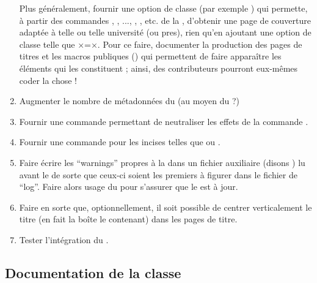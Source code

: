 \begin{enumerate}
  Plus généralement, fournir une option de classe (par exemple
  ) qui permette, à partir des commandes
  , , ...,
  , , etc. de la \yatcl{},
  d'obtenir une page de couverture adaptée à telle ou telle université (ou
  \gls{pres}), rien qu'en ajoutant une option de classe telle que
  ×=×. Pour ce faire, documenter la
  production des pages de titres et les macros publiques
  () qui permettent de faire apparaître les éléments
  qui les constituent ; ainsi, des contributeurs pourront eux-mêmes coder la
  chose !
\item Augmenter le nombre de métadonnées du  (au moyen du
   ?)
\item Fournir une commande  permettant de
  neutraliser les effets de la commande .
\item Fournir une commande  pour les incises telles que
   ou .
\item Faire écrire les \foreignquote{english}{warnings} propres à la \yatcl{}
  dans un fichier auxiliaire (disons ) lu avant le  de sorte que ceux-ci
  soient les premiers à figurer dans le fichier de
  \foreignquote{english}{log}. Faire alors usage du 
  pour s'assurer que le  est à jour.
\item Faire en sorte que, optionnellement, il soit possible de centrer
  verticalement le titre (en fait la boîte le contenant) dans les pages de
  titre.
\item Tester l'intégration du .
\end{enumerate}

\subsection{Documentation de la classe}
\label{sec:documentation-de-la-ult}

